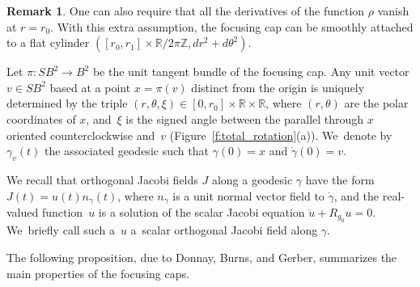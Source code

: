 \documentclass[JEP,XML,SOM,Unicode,NoFloatCountersInSection,published]{cedram}
\newcommand{\Z}{\mathbb{Z}}
\newcommand{\R}{\mathbb{R}}
\theoremstyle{plain}
\theoremstyle{definition}
\newtheorem{Remark}[Thm]{Remark}
\begin{document}
\begin{Remark}\label{r:attach_cap}
One can also require that all the derivatives of the function $\rho$ vanish at $r=r_0$. With this extra assumption, the focusing cap can be smoothly attached to a flat cylinder $([r_0,r_1]\times\R/2\pi\Z,dr^2+d\theta^2)$.
\end{Remark}

Let $\pi:SB^2\to B^2$ be the unit tangent bundle of the focusing cap. Any unit vector $v\in SB^2$ based at a point $x=\pi(v)$ distinct from the origin is uniquely determined by the triple $(r,\theta,\xi)\in[0,r_0]\times\R\times\R$, where $(r,\theta)$ are the polar coordinates of $x$, and~$\xi$ is the signed angle between the parallel through $x$ oriented counterclockwise and~$v$ (Figure~\ref{f:total_rotation}(a)). We~denote by $\gamma_v(t)$ the associated geodesic such that $\gamma(0)=x$ and $\dot\gamma(0)=v$.

We recall that orthogonal Jacobi fields $J$ along a geodesic $\gamma$ have the form $J(t)=u(t)n_\gamma(t)$, where $n_\gamma$ is a unit normal vector field to $\dot\gamma$, and the real-valued function~$u$ is a solution of the scalar Jacobi equation $\ddot u+R_{g_0} u=0$. We~briefly call such a~$u$ a~scalar orthogonal Jacobi field along $\gamma$.

The following proposition, due to Donnay, Burns, and Gerber, summarizes the main properties of the focusing caps.
\end{document}
